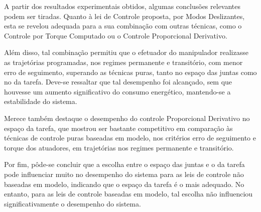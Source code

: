 \documentclass[]{politex}
\begin{document}


A partir dos resultados experimentais obtidos, algumas conclusões relevantes podem ser tiradas. Quanto à lei de Controle proposta, por Modos Deslizantes, esta se revelou adequada para a sua combinação com outras técnicas, como o Controle por Torque Computado ou o Controle Proporcional Derivativo. 

Além disso, tal combinação permitiu que o efetuador do manipulador realizasse as trajetórias programadas, nos regimes permanente e transitório, com menor erro de seguimento, superando as técnicas puras, tanto no espaço das juntas como no da tarefa. Deve-se ressaltar que tal desempenho foi alcançado, sem que houvesse um aumento significativo do consumo energético, mantendo-se a estabilidade do sistema.

Merece também destaque o desempenho do controle Proporcional Derivativo no espaço da tarefa, que mostrou ser bastante competitivo em comparação às técnicas de controle puras baseadas em modelo, nos critérios erro de seguimento e torque dos atuadores, em trajetórias nos regimes permanente e transitório. 

Por fim, pôde-se concluir que a escolha entre o espaço das juntas e o da tarefa pode influenciar muito no desempenho do sistema para as leis de controle não baseadas em modelo, indicando que o espaço da tarefa é o mais adequado. No entanto, para as leis de controle baseadas em modelo, tal escolha não influenciou significativamente o desempenho do sistema.
\end{document}
